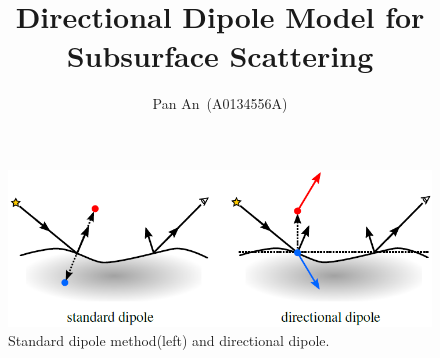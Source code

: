 \message{ !name(main.tex)}\documentclass[12pt]{article}
\title{\large\bf Directional Dipole Model for Subsurface Scattering}
\author{Pan An~(A0134556A)}
\begin{document}
\begin{figure}[!ht]
  \centering
  \includegraphics[scale=0.5]{dipoles.png}
  \caption{Standard dipole method(left) and directional dipole.}
  \label{fig:dipole}
\end{figure}

\end{document}
